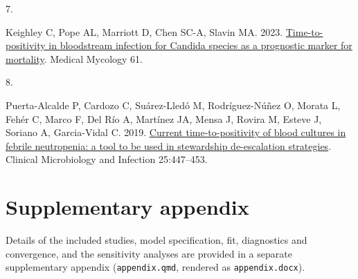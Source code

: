 \documentclass[
  11pt,
]{article}
\newlength{\cslhangindent}
\newlength{\csllabelwidth}
\newenvironment{CSLReferences}[2] %
 {\begin{list}{}{%
  \setlength{\itemindent}{0pt}
  \setlength{\leftmargin}{0pt}
  \setlength{\parsep}{0pt}
  \ifodd #1
   \setlength{\leftmargin}{\cslhangindent}
   \setlength{\itemindent}{-1\cslhangindent}
  \fi
  \setlength{\itemsep}{#2\baselineskip}}}
 {\end{list}}
\newcommand{\CSLLeftMargin}[1]{\parbox[t]{\csllabelwidth}{\strut#1\strut}}
\newcommand{\CSLRightInline}[1]{\parbox[t]{\linewidth - \csllabelwidth}{\strut#1\strut}}
\begin{document}
\begin{CSLReferences}{0}{1}
\CSLLeftMargin{7. }%
\CSLRightInline{Keighley C, Pope AL, Marriott D, Chen SC-A, Slavin MA.
2023. \href{https://doi.org/10.1093/mmy/myad028}{{Time-to-positivity in
bloodstream infection for Candida species as a prognostic marker for
mortality}}. Medical Mycology 61.}

\CSLLeftMargin{8. }%
\CSLRightInline{Puerta-Alcalde P, Cardozo C, Suárez-Lledó M,
Rodríguez-Núñez O, Morata L, Fehér C, Marco F, Del Río A, Martínez JA,
Mensa J, Rovira M, Esteve J, Soriano A, Garcia-Vidal C. 2019.
\href{https://doi.org/10.1016/j.cmi.2018.07.026}{{Current
time-to-positivity of blood cultures in febrile neutropenia: a tool to
be used in stewardship de-escalation strategies}}. Clinical Microbiology
and Infection 25:447--453.}

\end{CSLReferences}

\section*{Supplementary appendix}\label{supplementary-appendix}

Details of the included studies, model specification, fit, diagnostics
and convergence, and the sensitivity analyses are provided in a separate
supplementary appendix (\texttt{appendix.qmd}, rendered as
\texttt{appendix.docx}).
\end{document}

